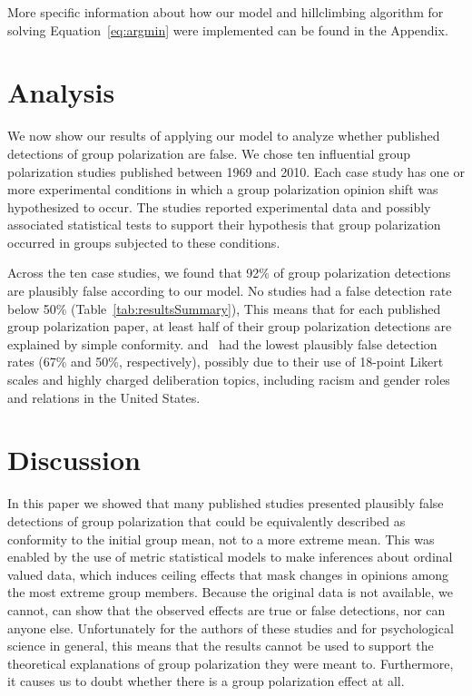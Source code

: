 More specific information about how our model and hillclimbing algorithm
for solving Equation~\ref{eq:argmin} were implemented can be found in the 
Appendix.



\section{Analysis}

We now show our results of applying our model to analyze whether published
detections of group polarization are false. We chose ten influential 
group polarization studies published between 1969 and
2010.  Each case study has one or more experimental conditions in which a 
group polarization opinion shift was hypothesized to occur. The studies
reported experimental data and possibly associated statistical tests
to support their hypothesis that group polarization occurred in groups
subjected to these conditions.
  
Across the ten case studies, we found that 92\% of group polarization
detections are plausibly false according to our model. No studies
had a false detection rate below 50\% (Table~\ref{tab:resultsSummary}),
This means that for each published group polarization paper, at least half of
their group polarization detections are explained by simple conformity.
 and~ had the lowest plausibly 
false detection rates (67\% and 50\%, respectively), 
possibly due to their use of 18-point Likert scales and highly
charged deliberation topics, including racism and gender roles and
relations in the United States.

\vspace{2em}



\section{Discussion}

In this paper we showed that many published studies presented plausibly 
false detections of group polarization that could be equivalently described
as conformity to the initial group mean, not to a more extreme mean. 
This was enabled by the use
of metric statistical models to make inferences about ordinal valued data,
which induces ceiling effects that mask changes in opinions among the most
extreme group members.  Because the original data is not
available, we cannot, can show that the observed effects are 
true or false detections, nor can anyone else. 
Unfortunately for the authors of these studies and
for psychological science in general, this means that the results cannot be
used to support the theoretical explanations of group polarization they were
meant to. Furthermore, it causes us to doubt whether there is a group polarization
effect at all. 

